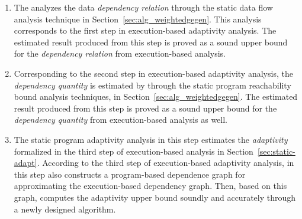 \begin{enumerate}
\item The {\THESYSTEM} analyzes the data \emph{dependency relation} through the static data flow analysis technique in Section~\ref{sec:alg_weightedgegen}.
This analysis corresponds to the first step in execution-based adaptivity analysis. 
The estimated result produced from 
this step is proved as a sound upper bound for the \emph{dependency relation} from execution-based analysis.
\item 
Corresponding to the second step in execution-based adaptivity analysis, the \emph{dependency quantity} 
is estimated by {\THESYSTEM} through the static program reachability bound analysis techniques, in Section~\ref{sec:alg_weightedgegen}.
The estimated result produced from 
this step is proved as a sound upper bound for the \emph{dependency quantity} from execution-based analysis as well.
\item 
The static program adaptivity analysis in this step
estimates the \emph{adaptivity} formalized in the third step of execution-based analysis in Section~\ref{sec:static-adapt}.
According to the third step of execution-based adaptivity analysis, 
{\THESYSTEM} in this step also constructs a program-based dependence graph for approximating the execution-based dependency graph.
Then, based on this graph, {\THESYSTEM} 
computes the adaptivity upper bound soundly 
and accurately through a newly designed algorithm.
\end{enumerate}


